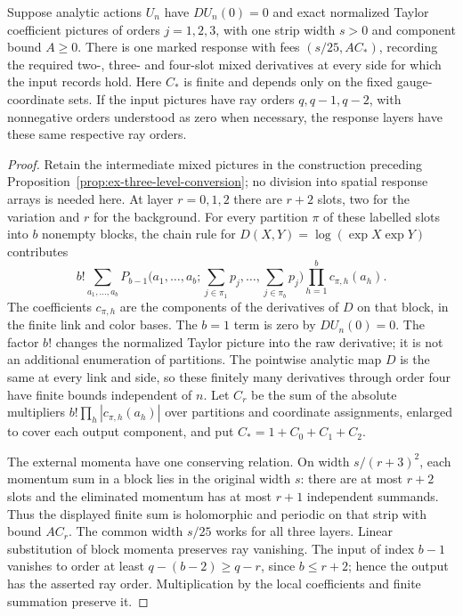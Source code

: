\begin{lemma}
\label{lem:annulus-priced-responses}
Suppose analytic actions $U_n$ have $DU_n(0)=0$ and exact normalized
Taylor coefficient pictures of orders $j=1,2,3$, with one strip width
$s>0$ and component bound $A\geq0$. There is one marked response with
fees $(s/25,AC_*)$, recording the required two-, three- and four-slot
mixed derivatives at every side for which the input records hold.
Here $C_*$ is finite and depends only on the fixed gauge-coordinate sets.
If the input pictures have ray orders $q,q-1,q-2$, with nonnegative
orders understood as zero when necessary, the response layers have
these same respective ray orders.
\end{lemma}
\begin{proof}
Retain the intermediate mixed pictures in the construction preceding
Proposition~\ref{prop:ex-three-level-conversion}; no division into
spatial response arrays is needed here. At layer $r=0,1,2$ there are
$r+2$ slots, two for the variation and $r$ for the background. For every
partition $\pi$ of these labelled slots into $b$ nonempty blocks, the
chain rule for $D(X,Y)=\log(\exp X\exp Y)$ contributes
\[
 b!\sum_{a_1,\ldots,a_b}
 P_{b-1}\bigl(a_1,\ldots,a_b;\textstyle\sum_{j\in\pi_1}p_j,
                  \ldots,\sum_{j\in\pi_b}p_j\bigr)
       \prod_{h=1}^b c_{\pi,h}(a_h).
\]
The coefficients $c_{\pi,h}$ are the components of the derivatives of
$D$ on that block, in the finite link and color bases. The $b=1$ term
is zero by $DU_n(0)=0$. The factor $b!$ changes the normalized Taylor
picture into the raw derivative; it is not an additional enumeration
of partitions. The pointwise analytic map $D$ is the same at every
link and side, so these finitely many derivatives through order four
have finite bounds independent of $n$. Let $C_r$ be the sum of the
absolute multipliers $b!\prod_h|c_{\pi,h}(a_h)|$ over partitions and
coordinate assignments, enlarged to cover each output component, and
put $C_* =1+C_0+C_1+C_2$.

The external momenta have one conserving relation. On width
$s/(r+3)^2$, each momentum sum in a block lies in the original width
$s$: there are at most $r+2$ slots and the eliminated momentum has
at most $r+1$ independent summands. Thus the displayed finite sum is
holomorphic and periodic on that strip with bound $AC_r$. The common
width $s/25$ works for all three layers. Linear substitution of block
momenta preserves ray vanishing. The input of index $b-1$ vanishes to
order at least $q-(b-2)\geq q-r$, since $b\leq r+2$; hence the output
has the asserted ray order. Multiplication by the local coefficients
and finite summation preserve it.


\end{proof}

